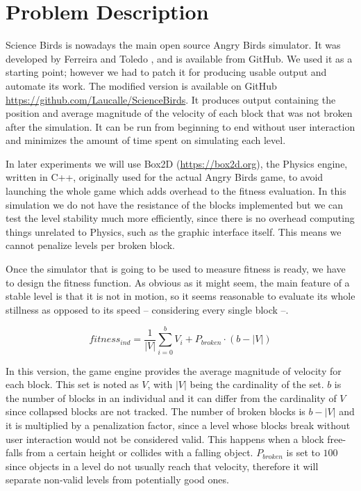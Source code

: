 \documentclass[a4paper,twoside]{article}
\begin{document}
\section{Problem Description}
\label{sec:angry}

Science Birds is nowadays the main open source Angry Birds
simulator. It was developed by  Ferreira and Toledo
\cite{ferreira2014search}, and is available from
GitHub. We used it  as a starting point; however we
had to patch it for producing usable output 
and automate its work. The modified 
version is available on GitHub \url{https://github.com/Laucalle/ScienceBirds}. It produces output 
containing the position and average magnitude of the velocity of each block 
that was not broken after the simulation. It can be run from beginning to end 
without user interaction and minimizes the amount of time spent on simulating 
each level. 

In later experiments we will use Box2D (\url{https://box2d.org}), the
Physics engine, written in C++, originally 
used for the actual Angry Birds game, to avoid launching the whole
game which adds overhead to the fitness evaluation. In this 
simulation we do not have the resistance of the blocks implemented but we can test
the level stability much more efficiently, since there is no overhead computing things
unrelated to Physics, such as the graphic interface itself. This means we cannot penalize levels per broken block.


Once the simulator that is going to be used to measure fitness is
ready, we have to design the fitness function. As obvious as it
might seem, the main feature of a stable level is that it 
is not in motion, so it seems reasonable to evaluate its whole stillness as opposed to its speed -- considering every single block --.

$$fitness_{ind} = \frac{1}{|V|}\sum_{i=0}^{b}{V_i} + P_{broken}\cdot(b-|V|)$$

In this version, the game engine provides the average magnitude of
velocity for each block. 
This set is noted as $V$, with $|V|$ being the cardinality of the
set.  $b$  is the number of blocks in an individual and it can differ
from the cardinality of $V$ since collapsed blocks are not tracked. The
number of broken blocks is $b-|V|$ and it is multiplied by a
penalization factor, since a level whose blocks break without user
interaction would not be considered valid. This happens when a block
free-falls from a certain height or collides with a falling object. 
$P_{broken}$ is set to $100$ since objects in a level do not usually reach that 
velocity, therefore it will separate non-valid levels from potentially good 
ones.
\end{document}
